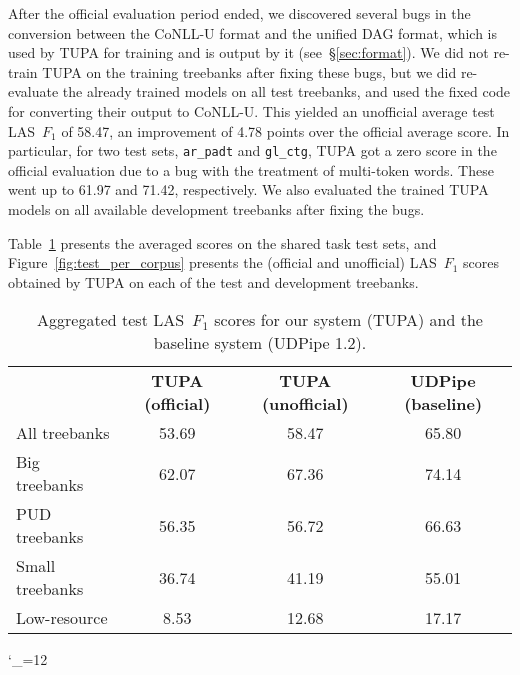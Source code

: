 \documentclass[11pt,a4paper]{article}
\begin{document}
After the official evaluation period ended,
we discovered several bugs in the conversion between the CoNLL-U format
and the unified DAG format, which is used by TUPA for training and is output by it
(see~\S\ref{sec:format}).
We did not re-train TUPA on the training treebanks after fixing these bugs,
but we did re-evaluate the already trained models on all test treebanks,
and used the fixed code for converting their output to CoNLL-U.
This yielded an unofficial average test LAS~$F_1$ of 58.47,
an improvement of 4.78 points over the official average score.
In particular, for two test sets, \verb|ar_padt| and \verb|gl_ctg|, TUPA got
a zero score in the official evaluation due to a bug with the treatment of multi-token words.
These went up to 61.97 and 71.42, respectively.
We also evaluated the trained TUPA models on all available development treebanks
after fixing the bugs.

Table~\ref{tab:overall_results} presents the
averaged scores on the shared task test sets,
and Figure~\ref{fig:test_per_corpus} presents the (official and unofficial) LAS~$F_1$
scores obtained by TUPA on each of the test and development treebanks.

\begin{table}
\begin{tabular}{lccc}
\hline
& \multirow{2}{12mm}{\bf TUPA {\small(official)}} & \multirow{2}{15mm}{\bf TUPA {\small(unofficial)}}
& \multirow{2}{14mm}{\bf UDPipe {\small(baseline)}} \\\\
\hline
All treebanks & 53.69 & 58.47 & 65.80 \\
Big treebanks & 62.07 & 67.36 & 74.14 \\
PUD treebanks & 56.35 & 56.72 & 66.63 \\
Small treebanks & 36.74 & 41.19 & 55.01 \\
Low-resource & 8.53 & 12.68 & 17.17
\end{tabular}
\caption{Aggregated test LAS~$F_1$ scores
for our system (TUPA) and the baseline system (UDPipe 1.2).
\label{tab:overall_results}}
\end{table}

\catcode`\_=12
\corpusa
{}\corpusb
{}\corpusc
\end{document}
